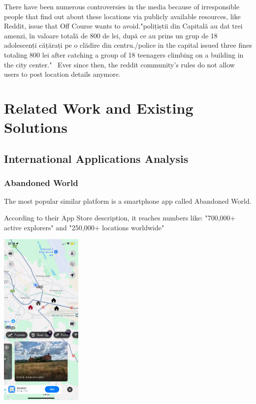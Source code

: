 \documentclass[12pt,a4paper]{report}
\begin{document}
There have been numerous controversies in the media because of irresponsible people that find out about these locations via publicly available resources, like Reddit, issue that Off Course wants to avoid."polițiștii din Capitală au dat trei amenzi, în valoare totală de 800 de lei, după ce au prins un grup de 18 adolescenți cățărați pe o clădire din centru./police in the capital issued three fines totaling 800 lei after catching a group of 18 teenagers climbing on a building in the city center."~\cite{articleUrbexControversy} Ever since then, the reddit community's rules do not allow users to post location details anymore.

\chapter{Related Work and Existing Solutions}
\section{International Applications Analysis}
\subsection{Abandoned World}
The most popular similar platform is a smartphone app called Abandoned World.

According to their App Store description, it reaches numbers like: "700,000+ active explorers" and "250,000+ locations worldwide"~\cite{appAbandonedWorld}

\begin{center}
\includegraphics[width=0.3\textwidth]{images/abandonedworld.png}
\end{center}
\end{document}
